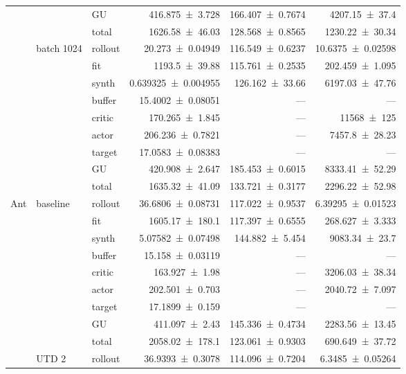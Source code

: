 {\begin{longtable}{@{}lllrrr@{}}
     &  & GU & \num{416.875+-3.728} & \num{166.407+-0.7674} & \num{4207.15+-37.4} \\
     &  & total & \num{1626.58+-46.03} & \num{128.568+-0.8565} & \num{1230.22+-30.34} \\
    \addlinespace[2pt]
     & batch 1024 & rollout & \num{20.273+-0.04949} & \num{116.549+-0.6237} & \num{10.6375+-0.02598} \\
     &  & fit & \num{1193.5+-39.88} & \num{115.761+-0.2535} & \num{202.459+-1.095} \\
     &  & synth & \num{0.639325+-0.004955} & \num{126.162+-33.66} & \num{6197.03+-47.76} \\
     &  & buffer & \num{15.4002+-0.08051} & --- & --- \\
     &  & critic & \num{170.265+-1.845} & --- & \num{11568+-125} \\
     &  & actor & \num{206.236+-0.7821} & --- & \num{7457.8+-28.23} \\
     &  & target & \num{17.0583+-0.08383} & --- & --- \\
     &  & GU & \num{420.908+-2.647} & \num{185.453+-0.6015} & \num{8333.41+-52.29} \\
     &  & total & \num{1635.32+-41.09} & \num{133.721+-0.3177} & \num{2296.22+-52.98} \\
    \addlinespace[2pt]
    \midrule
    Ant & baseline & rollout & \num{36.6806+-0.08731} & \num{117.022+-0.9537} & \num{6.39295+-0.01523} \\
     &  & fit & \num{1605.17+-180.1} & \num{117.397+-0.6555} & \num{268.627+-3.333} \\
     &  & synth & \num{5.07582+-0.07498} & \num{144.882+-5.454} & \num{9083.34+-23.7} \\
     &  & buffer & \num{15.158+-0.03119} & --- & --- \\
     &  & critic & \num{163.927+-1.98} & --- & \num{3206.03+-38.34} \\
     &  & actor & \num{202.501+-0.703} & --- & \num{2040.72+-7.097} \\
     &  & target & \num{17.1899+-0.159} & --- & --- \\
     &  & GU & \num{411.097+-2.43} & \num{145.336+-0.4734} & \num{2283.56+-13.45} \\
     &  & total & \num{2058.02+-178.1} & \num{123.061+-0.9303} & \num{690.649+-37.72} \\
    \addlinespace[2pt]
     & UTD 2 & rollout & \num{36.9393+-0.3078} & \num{114.096+-0.7204} & \num{6.3485+-0.05264} \\

\end{longtable}}
